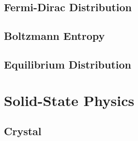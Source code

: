 \documentclass[10pt]{report}
\begin{document}
\section{Fermi-Dirac Distribution}
\clearpage

\section{Boltzmann Entropy}
\clearpage

\section{Equilibrium Distribution}
\clearpage

\chapter{Solid-State Physics}\clearpage

\section{Crystal}
\clearpage
\printbibliography
\end{document}
